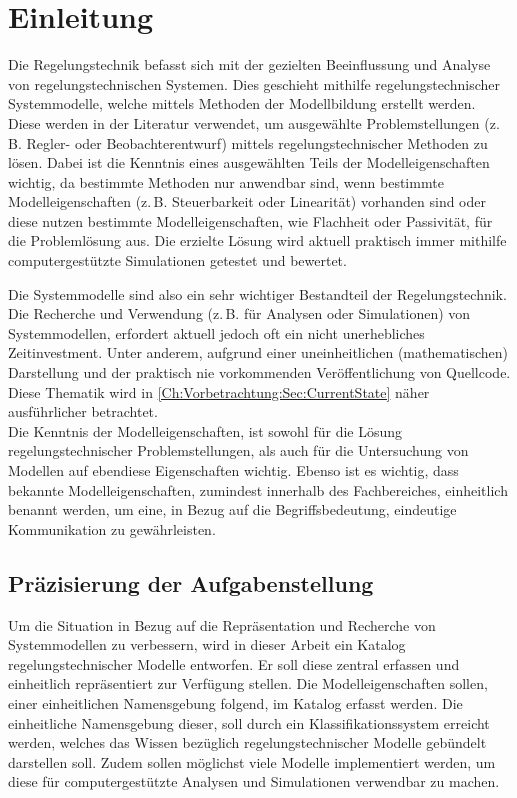 \chapter{Einleitung}
\label{Ch:Einleitung}

Die Regelungstechnik befasst sich mit der gezielten Beeinflussung und Analyse von regelungstechnischen Systemen. Dies geschieht mithilfe regelungstechnischer Systemmodelle, welche mittels Methoden der Modellbildung erstellt werden. Diese werden in der Literatur verwendet, um ausgewählte Problemstellungen (z.\,B. Regler- oder Beobachterentwurf) mittels regelungstechnischer Methoden zu lösen. Dabei ist die Kenntnis eines ausgewählten Teils der Modelleigenschaften wichtig, da bestimmte Methoden nur anwendbar sind, wenn bestimmte Modelleigenschaften (z.\,B. Steuerbarkeit oder Linearität) vorhanden sind oder diese nutzen bestimmte Modelleigenschaften, wie Flachheit oder Passivität, für die Problemlösung aus. Die erzielte Lösung wird aktuell praktisch immer mithilfe computergestützte Simulationen getestet und bewertet.

Die Systemmodelle sind also ein sehr wichtiger Bestandteil der Regelungstechnik. Die Recherche und Verwendung (z.\,B. für Analysen oder Simulationen) von Systemmodellen, erfordert aktuell jedoch oft ein nicht unerhebliches Zeitinvestment. Unter anderem, aufgrund einer uneinheitlichen (mathematischen) Darstellung und der praktisch nie vorkommenden Veröffentlichung von Quellcode. Diese Thematik wird in \autoref{Ch:Vorbetrachtung:Sec:CurrentState} näher ausführlicher betrachtet. \\
Die Kenntnis der Modelleigenschaften, ist sowohl für die Lösung regelungstechnischer Problemstellungen, als auch für die Untersuchung von Modellen auf ebendiese Eigenschaften wichtig. Ebenso ist es wichtig, dass bekannte Modelleigenschaften, zumindest innerhalb des Fachbereiches, einheitlich benannt werden, um eine, in Bezug auf die Begriffsbedeutung, eindeutige Kommunikation zu gewährleisten. 

\section{Präzisierung der Aufgabenstellung}
Um die Situation in Bezug auf die Repräsentation und Recherche von Systemmodellen zu verbessern, wird in dieser Arbeit ein Katalog regelungstechnischer Modelle entworfen. Er soll diese zentral erfassen und einheitlich repräsentiert zur Verfügung stellen. Die Modelleigenschaften sollen, einer einheitlichen Namensgebung folgend, im Katalog erfasst werden. Die einheitliche Namensgebung dieser, soll durch ein Klassifikationssystem erreicht werden, welches das Wissen bezüglich regelungstechnischer Modelle gebündelt darstellen soll. Zudem sollen möglichst viele Modelle implementiert werden, um diese für computergestützte Analysen und Simulationen verwendbar zu machen. 




